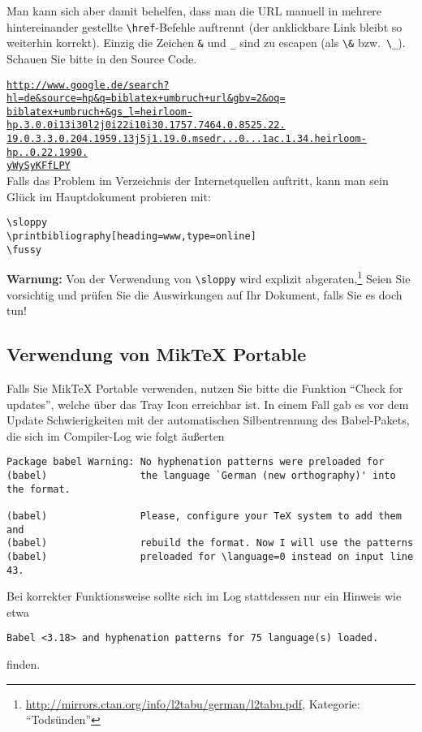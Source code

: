 Man kann sich aber damit behelfen, dass man die URL manuell in mehrere hintereinander gestellte \verb|\href|-Befehle auftrennt (der anklickbare Link bleibt so weiterhin korrekt). Einzig die Zeichen \verb|&| und \verb|_| sind zu escapen (als \verb|\&| bzw.\ \verb|\_|). Schauen Sie bitte in den Source Code.

\newcommand{\mylongurl}[1]{%
\href{http://www.google.de/search?hl=de&source=hp&q=biblatex+umbruch+url&gbv=2&oq=biblatex+umbruch+&gs_l=heirloom-hp.3.0.0i13i30l2j0i22i10i30.1757.7464.0.8525.22.19.0.3.3.0.204.1959.13j5j1.19.0.msedr...0...1ac.1.34.heirloom-hp..0.22.1990.yWySyKFfLPY}{\texttt{#1}}\\}

\mylongurl{http://www.google.de/search?hl=de\&source=hp\&q=biblatex+umbruch+url\&gbv=2\&oq=}
\mylongurl{biblatex+umbruch+\&gs\_l=heirloom-hp.3.0.0i13i30l2j0i22i10i30.1757.7464.0.8525.22.}
\mylongurl{19.0.3.3.0.204.1959.13j5j1.19.0.msedr...0...1ac.1.34.heirloom-hp..0.22.1990.}
\mylongurl{yWySyKFfLPY}

Falls das Problem im Verzeichnis der Internetquellen auftritt, kann man sein Glück im Hauptdokument probieren mit:
\begin{lstlisting}
\sloppy
\printbibliography[heading=www,type=online]
\fussy
\end{lstlisting}


\textbf{Warnung:} Von der Verwendung von \verb|\sloppy| wird explizit abgeraten,\footnote{\url{http://mirrors.ctan.org/info/l2tabu/german/l2tabu.pdf}, Kategorie: \enquote{Todsünden}}
Seien Sie vorsichtig und prüfen Sie die Auswirkungen auf Ihr Dokument, falls Sie es doch tun!

\subsection{Verwendung von MikTeX Portable}
Falls Sie MikTeX Portable verwenden, nutzen Sie bitte die Funktion \enquote{Check for updates}, welche über das Tray Icon erreichbar ist. In einem Fall gab es vor dem Update Schwierigkeiten mit der automatischen Silbentrennung des Babel-Pakets, die sich im Compiler-Log wie folgt äußerten
{\small
\begin{verbatim}
Package babel Warning: No hyphenation patterns were preloaded for
(babel)                the language `German (new orthography)' into the format.

(babel)                Please, configure your TeX system to add them and
(babel)                rebuild the format. Now I will use the patterns
(babel)                preloaded for \language=0 instead on input line 43.
\end{verbatim}
}

Bei korrekter Funktionsweise sollte sich im Log stattdessen nur ein Hinweis wie etwa
{\small
\begin{verbatim}
Babel <3.18> and hyphenation patterns for 75 language(s) loaded.
\end{verbatim}
}

finden.